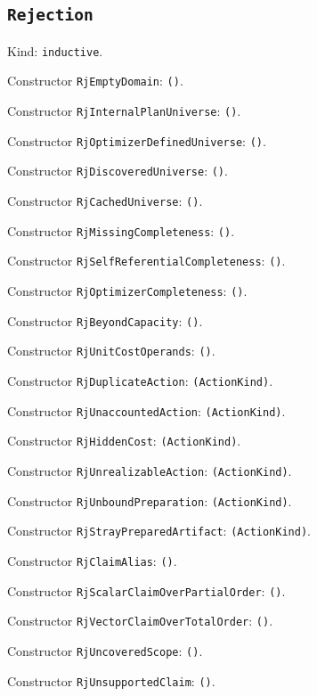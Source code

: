 \documentclass[11pt]{article}
\begin{document}
\subsection*{\texttt{Rejection}}
\noindent Kind: \texttt{inductive}.\par
\noindent Constructor \texttt{RjEmptyDomain}: \texttt{()}.\par
\noindent Constructor \texttt{RjInternalPlanUniverse}: \texttt{()}.\par
\noindent Constructor \texttt{RjOptimizerDefinedUniverse}: \texttt{()}.\par
\noindent Constructor \texttt{RjDiscoveredUniverse}: \texttt{()}.\par
\noindent Constructor \texttt{RjCachedUniverse}: \texttt{()}.\par
\noindent Constructor \texttt{RjMissingCompleteness}: \texttt{()}.\par
\noindent Constructor \texttt{RjSelfReferentialCompleteness}: \texttt{()}.\par
\noindent Constructor \texttt{RjOptimizerCompleteness}: \texttt{()}.\par
\noindent Constructor \texttt{RjBeyondCapacity}: \texttt{()}.\par
\noindent Constructor \texttt{RjUnitCostOperands}: \texttt{()}.\par
\noindent Constructor \texttt{RjDuplicateAction}: \texttt{(ActionKind)}.\par
\noindent Constructor \texttt{RjUnaccountedAction}: \texttt{(ActionKind)}.\par
\noindent Constructor \texttt{RjHiddenCost}: \texttt{(ActionKind)}.\par
\noindent Constructor \texttt{RjUnrealizableAction}: \texttt{(ActionKind)}.\par
\noindent Constructor \texttt{RjUnboundPreparation}: \texttt{(ActionKind)}.\par
\noindent Constructor \texttt{RjStrayPreparedArtifact}: \texttt{(ActionKind)}.\par
\noindent Constructor \texttt{RjClaimAlias}: \texttt{()}.\par
\noindent Constructor \texttt{RjScalarClaimOverPartialOrder}: \texttt{()}.\par
\noindent Constructor \texttt{RjVectorClaimOverTotalOrder}: \texttt{()}.\par
\noindent Constructor \texttt{RjUncoveredScope}: \texttt{()}.\par
\noindent Constructor \texttt{RjUnsupportedClaim}: \texttt{()}.\par
\end{document}
